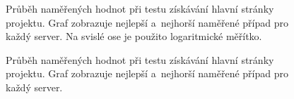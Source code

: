             \begin{figure}[h!t]
             \begin{adjustwidth}{-0.5cm}{}
                \begin{center}
                    \caption{Průběh naměřených hodnot při testu získávání hlavní stránky projektu.
                        Graf zobrazuje nejlepší a~nejhorší naměřené případ pro každý server.  
                        Na svislé ose je použito logaritmické měřítko.}
                    \label{imgGetMainPageCely}
                \end{center}
             \end{adjustwidth}
            \end{figure}

            \begin{figure}[h!t]
             \begin{adjustwidth}{-0.5cm}{}
                \begin{center}
                    \caption{Průběh naměřených hodnot při testu získávání hlavní stránky projektu.
                        Graf zobrazuje nejlepší a~nejhorší naměřené případ pro každý server.}
                    \label{imgGetMainPageCast}
                \end{center}
             \end{adjustwidth}
            \end{figure}


